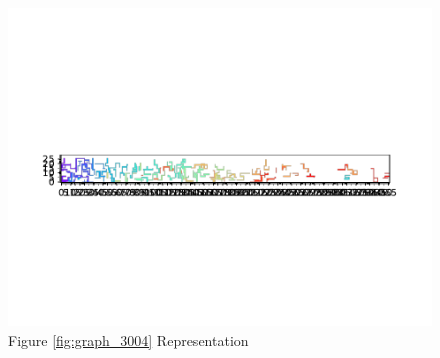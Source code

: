 \documentclass{standalone}
\begin{document}
\begin{figure}[!htb]
	\caption{Figure \ref{fig:graph_3004} Representation}
	\label{fig:picture_3004}
	\includegraphics[width=\textwidth]{../graphs/picture/3004.pdf}
\end{figure}
\end{document}
